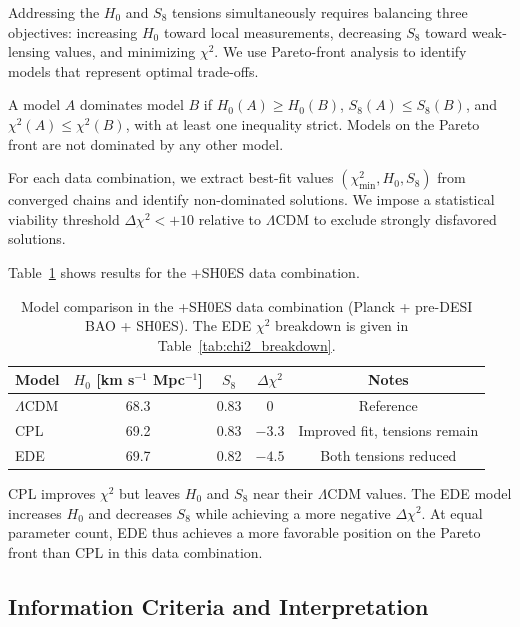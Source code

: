 \documentclass[a4paper,11pt]{article}
\begin{document}
Addressing the $H_0$ and $S_8$ tensions simultaneously requires balancing three objectives: increasing $H_0$ toward local measurements, decreasing $S_8$ toward weak-lensing values, and minimizing $\chi^2$. We use Pareto-front analysis to identify models that represent optimal trade-offs.

A model $A$ dominates model $B$ if $H_0(A) \ge H_0(B)$, $S_8(A) \le S_8(B)$, and $\chi^2(A) \le \chi^2(B)$, with at least one inequality strict. Models on the Pareto front are not dominated by any other model.

For each data combination, we extract best-fit values $(\chi^2_{\min}, H_0, S_8)$ from converged chains and identify non-dominated solutions. We impose a statistical viability threshold $\Delta\chi^2 < +10$ relative to $\Lambda$CDM to exclude strongly disfavored solutions.

Table~\ref{tab:pareto_shoes} shows results for the +SH0ES data combination.

\begin{table}[h]
\centering
\caption{Model comparison in the +SH0ES data combination (Planck + pre-DESI BAO + SH0ES). The EDE $\chi^2$ breakdown is given in Table~\ref{tab:chi2_breakdown}.}
\label{tab:pareto_shoes}
\begin{tabular}{lcccc}
\toprule
Model & $H_0$ [km s$^{-1}$ Mpc$^{-1}$] & $S_8$ & $\Delta\chi^2$ & Notes \\
\midrule
$\Lambda$CDM & 68.3 & 0.83 & 0 & Reference \\
CPL & 69.2 & 0.83 & $-3.3$ & Improved fit, tensions remain \\
EDE & 69.7 & 0.82 & $-4.5$ & Both tensions reduced \\
\bottomrule
\end{tabular}
\end{table}

CPL improves $\chi^2$ but leaves $H_0$ and $S_8$ near their $\Lambda$CDM values. The EDE model increases $H_0$ and decreases $S_8$ while achieving a more negative $\Delta\chi^2$. At equal parameter count, EDE thus achieves a more favorable position on the Pareto front than CPL in this data combination.


\subsection{Information Criteria and Interpretation}
\label{sec:aic_bic}
\end{document}
